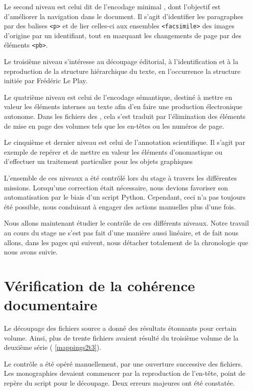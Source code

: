 Le second niveau est celui dit de l'encodage \og minimal \fg, dont l'objectif est d'améliorer la navigation dans le document. Il s'agit d'identifier les paragraphes par des balises \texttt{<p>} et de lier celles-ci aux ensembles \texttt{<facsimile>} des images d'origine par un identifiant, tout en marquant les changements de page par des éléments \texttt{<pb>}.

Le troisième niveau s'intéresse au découpage éditorial, \cad{} à l'identification et à la reproduction de la structure hiérarchique du texte, en l'occurrence la structure initiée par Frédéric Le Play.

Le quatrième niveau est celui de l'encodage sémantique, destiné à mettre en valeur les éléments internes au texte afin d'en faire une production électronique autonome. Dans les fichiers des \odm, cela s'est traduit par l'élimination des éléments de mise en page des volumes tels que les en-têtes ou les numéros de page.

Le cinquième et dernier niveau est celui de l'annotation scientifique. Il s'agit par exemple de repérer et de mettre en valeur les éléments d'onomastique ou d'effectuer un traitement particulier pour les objets graphiques

L'ensemble de ces niveaux a été contrôlé lors du stage à travers les différentes missions. Lorsqu'une correction était nécessaire, nous devions favoriser son automatisation par le biais d'un script Python. Cependant, ceci n’a pas toujours été possible, nous conduisant à engager des actions manuelles plus d'une fois.

Nous allons maintenant étudier le contrôle de ces différents niveaux. Notre travail au cours du stage ne s'est pas fait d'une manière aussi linéaire, et de fait nous allons,  dans les pages qui suivent, nous détacher totalement de la chronologie que nous avons suivie.

\section{Vérification de la cohérence documentaire}

Le découpage des fichiers source a donné des résultats étonnants pour certain volume. Ainsi, plus de trente fichiers avaient résulté du troisième volume de la deuxième série (\ann{} \ref{mappings2t3}).

Le contrôle a été opéré manuellement, par une ouverture successive des fichiers. Les monographies devaient commencer par la reproduction de l'en-tête, point de repère du script \lse{} pour le découpage. Deux erreurs majeures ont été constatée.

